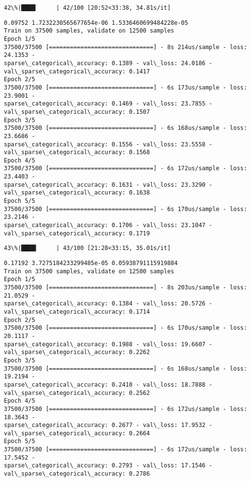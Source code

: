\documentclass[11pt]{article}
\begin{document}
    \begin{Verbatim}[commandchars=\\\{\}]
 42\%|████▏     | 42/100 [20:52<33:38, 34.81s/it]
    \end{Verbatim}

    \begin{Verbatim}[commandchars=\\\{\}]
0.09752 1.7232230565677654e-06 1.5336460699484228e-05
Train on 37500 samples, validate on 12500 samples
Epoch 1/5
37500/37500 [==============================] - 8s 214us/sample - loss: 24.1353 -
sparse\_categorical\_accuracy: 0.1389 - val\_loss: 24.0186 -
val\_sparse\_categorical\_accuracy: 0.1417
Epoch 2/5
37500/37500 [==============================] - 6s 173us/sample - loss: 23.9001 -
sparse\_categorical\_accuracy: 0.1469 - val\_loss: 23.7855 -
val\_sparse\_categorical\_accuracy: 0.1507
Epoch 3/5
37500/37500 [==============================] - 6s 168us/sample - loss: 23.6686 -
sparse\_categorical\_accuracy: 0.1556 - val\_loss: 23.5558 -
val\_sparse\_categorical\_accuracy: 0.1568
Epoch 4/5
37500/37500 [==============================] - 6s 172us/sample - loss: 23.4403 -
sparse\_categorical\_accuracy: 0.1631 - val\_loss: 23.3290 -
val\_sparse\_categorical\_accuracy: 0.1638
Epoch 5/5
37500/37500 [==============================] - 6s 170us/sample - loss: 23.2146 -
sparse\_categorical\_accuracy: 0.1706 - val\_loss: 23.1047 -
val\_sparse\_categorical\_accuracy: 0.1719
    \end{Verbatim}

    \begin{Verbatim}[commandchars=\\\{\}]
 43\%|████▎     | 43/100 [21:28<33:15, 35.01s/it]
    \end{Verbatim}

    \begin{Verbatim}[commandchars=\\\{\}]
0.17192 3.7275184233299485e-05 0.05938791115919884
Train on 37500 samples, validate on 12500 samples
Epoch 1/5
37500/37500 [==============================] - 8s 203us/sample - loss: 21.0529 -
sparse\_categorical\_accuracy: 0.1384 - val\_loss: 20.5726 -
val\_sparse\_categorical\_accuracy: 0.1714
Epoch 2/5
37500/37500 [==============================] - 6s 170us/sample - loss: 20.1117 -
sparse\_categorical\_accuracy: 0.1988 - val\_loss: 19.6607 -
val\_sparse\_categorical\_accuracy: 0.2262
Epoch 3/5
37500/37500 [==============================] - 6s 168us/sample - loss: 19.2194 -
sparse\_categorical\_accuracy: 0.2410 - val\_loss: 18.7888 -
val\_sparse\_categorical\_accuracy: 0.2562
Epoch 4/5
37500/37500 [==============================] - 6s 172us/sample - loss: 18.3643 -
sparse\_categorical\_accuracy: 0.2677 - val\_loss: 17.9532 -
val\_sparse\_categorical\_accuracy: 0.2664
Epoch 5/5
37500/37500 [==============================] - 6s 172us/sample - loss: 17.5452 -
sparse\_categorical\_accuracy: 0.2793 - val\_loss: 17.1546 -
val\_sparse\_categorical\_accuracy: 0.2786
    \end{Verbatim}
\end{document}
